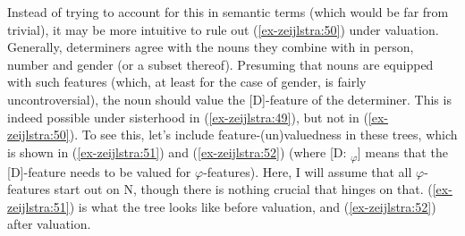 \documentclass[output=paper
,modfonts
,nonflat]{langsci/langscibook}
\begin{document}
\begin{figure}[!h]
	\begin{exe}
	\end{exe} \vspace{-1cm}
\end{figure}
\newpage\noindent Instead of trying to account for this in semantic terms (which would be far from trivial), it may be more intuitive to rule out (\ref{ex-zeijlstra:50}) under valuation. Generally, determiners agree with the nouns they combine with in person, number and gender (or a subset thereof). Presuming that nouns are equipped with such features (which, at least for the case of gender, is fairly uncontroversial), the noun should value the [D]-feature of the determiner. This is indeed possible under sisterhood in (\ref{ex-zeijlstra:49}), but not in (\ref{ex-zeijlstra:50}). To see this, let’s include feature-(un)valuedness in these trees, which is shown in (\ref{ex-zeijlstra:51}) and (\ref{ex-zeijlstra:52}) (where [D: \ul{}\textsubscript{$\varphi$}] means that the [D]-feature needs to be valued for $\varphi$-features). Here, I will assume that all $\varphi$-features start out on N, though there is nothing crucial that hinges on that. (\ref{ex-zeijlstra:51}) is what the tree looks like before valuation, and (\ref{ex-zeijlstra:52}) after valuation.
\end{document}
